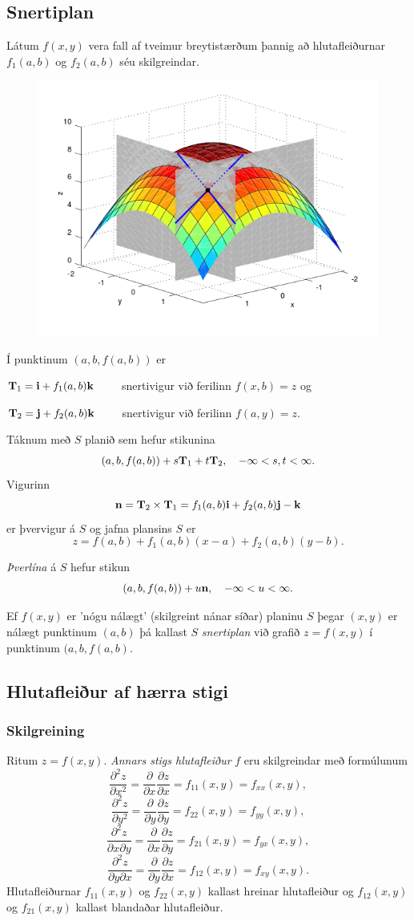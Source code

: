 \subsection{Snertiplan}
  Látum $f(x,y)$ vera fall af tveimur breytistærðum þannig að hlutafleiðurnar $f_1(a,b)$ og $f_2(a,b)$ séu skilgreindar.
  \begin{figure}
           \centering
            \includegraphics[width=0.6\linewidth]{bothpart.png}
    \end{figure}
    Í punktinum $(a,b,f(a,b))$ er 
    
    $\mbox{${\bf T}$}_1 = \mbox{${\bf i}$} + f_1(a,b)\mbox{${\bf k}$}\qquad$ snertivigur við ferilinn $f(x,b) = z$ og
    
    $\mbox{${\bf T}$}_2 = \mbox{${\bf j}$} + f_2(a,b)\mbox{${\bf k}$}\qquad$ snertivigur við ferilinn $f(a,y) = z$.



 Táknum með $S$ planið sem hefur stikunina
$$(a,b,f(a,b))+s\mbox{${\bf T}$}_1+t\mbox{${\bf T}$}_2, \quad -\infty < s,t < \infty.$$
Vigurinn 
$$\mbox{${\bf n}$}=\mbox{${\bf T}$}_2\times \mbox{${\bf T}$}_1=f_1(a,b)\mbox{${\bf i}$}+f_2(a,b)\mbox{${\bf j}$}-\mbox{${\bf k}$}$$ er þvervigur á $S$ og jafna plansins $S$ er
$$z=f(a,b)+f_1(a,b)(x-a)+f_2(a,b)(y-b).$$

\emph{Þverlína} á $S$ hefur stikun
$$(a,b,f(a,b)) + u \mbox{${\bf n}$}, \quad -\infty < u < \infty.$$

Ef $f(x,y)$ er 'nógu nálægt' (skilgreint nánar síðar) planinu $S$ þegar $(x,y)$ er nálægt punktinum $(a,b)$ þá kallast $S$ \emph{snertiplan} við grafið $z=f(x,y)$ í punktinum $(a,b,f(a,b)$.


\subsection{Hlutafleiður af hærra stigi}
 \subsubsection{Skilgreining }
  Ritum $z=f(x,y)$.  {\em Annars stigs
  hlutafleiður} $f$ eru skilgreindar með formúlunum
$$\frac{\partial^2 z}{\partial x^2}=
\frac{\partial}{\partial x} \frac{\partial z}{\partial x}
=f_{11}(x,y)=f_{xx}(x,y),$$
$$\frac{\partial^2 z}{\partial y^2}=
\frac{\partial}{\partial y} \frac{\partial z}{\partial y}
=f_{22}(x,y)=f_{yy}(x,y),$$
$$\frac{\partial^2 z}{\partial x\partial y}=
\frac{\partial}{\partial x} \frac{\partial z}{\partial y}
=f_{21}(x,y)=f_{yx}(x,y),$$
$$\frac{\partial^2 z}{\partial y\partial x}=
\frac{\partial}{\partial y} \frac{\partial z}{\partial x}
=f_{12}(x,y)=f_{xy}(x,y).$$
Hlutafleiðurnar $f_{11}(x,y)$ og $f_{22}(x,y)$ kallast hreinar
hlutafleiður og $f_{12}(x,y)$ og $f_{21}(x,y)$ kallast blandaðar
hlutafleiður.  
 

